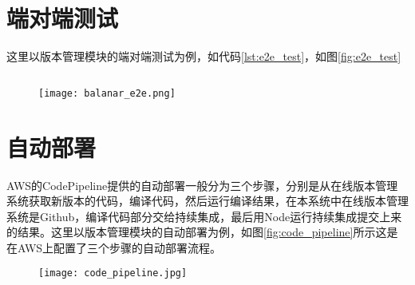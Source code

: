 \section{端对端测试}
这里以版本管理模块的端对端测试为例，如代码\ref{lst:e2e_test}，如图\ref{fig:e2e_test}

\begin{lstlisting}[language={JavaScript}, label={lst:e2e_test}, caption={端对端测试样例代码}]

\end{lstlisting}

\begin{figure}[!htp]
 \centering
 \texttt{[image: balanar\_e2e.png]}
\end{figure}

\section{自动部署}
AWS的CodePipeline提供的自动部署一般分为三个步骤，分别是从在线版本管理系统获取新版本的代码，编译代码，然后运行编译结果，在本系统中在线版本管理系统是Github，编译代码部分交给持续集成，最后用Node运行持续集成提交上来的结果。这里以版本管理模块的自动部署为例，如图\ref{fig:code_pipeline}所示这是在AWS上配置了三个步骤的自动部署流程。
\begin{figure}[H]
 \centering
 \texttt{[image: code\_pipeline.jpg]}
\end{figure}

